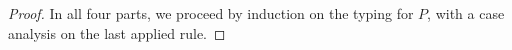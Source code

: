 \begin{proof}
	In all four parts, we proceed by induction on the typing for $P$,
	with a case analysis on the last applied rule. 
%
\end{proof}

%

